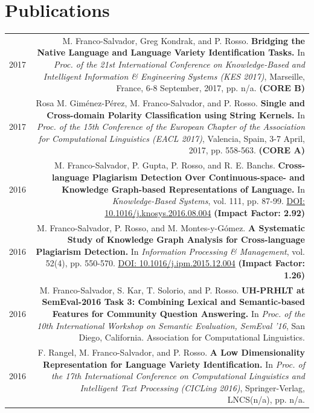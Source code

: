 \documentclass[10pt]{article}
\begin{document}
\section*{Publications}
\begin{tabular}{L!{\VRule}R}
	2017&M. Franco-Salvador, Greg Kondrak, and P. Rosso. \textbf{Bridging the Native Language and Language Variety Identification Tasks.}
	In \emph{Proc. of the 21st International Conference on Knowledge-Based and Intelligent Information \& Engineering Systems (KES 2017)}, Marseille, France, 6-8 September, 2017, pp. n/a. \textbf{(CORE B)}\vspace{5pt}\\
2017&Rosa M. Gim{\'e}nez-P{\'e}rez, M. Franco-Salvador, and P. Rosso. \textbf{Single and Cross-domain Polarity Classification using String Kernels.}
    In \emph{Proc. of the 15th Conference of the European Chapter of the Association for Computational Linguistics (EACL 2017)}, Valencia, Spain, 3-7 April, 2017, pp. 558-563. \textbf{(CORE A)}\vspace{5pt}\\
2016&M. Franco-Salvador, P. Gupta, P. Rosso, and R. E. Banchs. \textbf{Cross-language Plagiarism Detection Over Continuous-space- and Knowledge Graph-based Representations of Language.}
    In \emph{Knowledge-Based Systems}, vol. 111, pp. 87-99. \href{http://dx.doi.org/10.1016/j.knosys.2016.08.004}{DOI: 10.1016/j.knosys.2016.08.004} \textbf{(Impact Factor: 2.92)} \vspace{5pt}\\
2016&M. Franco-Salvador, P. Rosso, and M. Montes-y-G{\'o}mez. \textbf{A Systematic Study of Knowledge Graph Analysis for Cross-language Plagiarism Detection.}
    In \emph{Information Processing \& Management}, vol. 52(4), pp. 550-570. \href{http://dx.doi.org/10.1016/j.ipm.2015.12.004}{DOI: 10.1016/j.ipm.2015.12.004} \textbf{(Impact Factor: 1.26)} \vspace{5pt}\\
2016 &M. Franco-Salvador, S. Kar, T. Solorio, and P. Rosso. \textbf{UH-PRHLT at SemEval-2016 Task 3: Combining Lexical and Semantic-based Features for Community Question Answering.} In \emph{Proc. of the 10th International Workshop on Semantic Evaluation, SemEval '16}, San Diego, California. Association for Computational Linguistics. \vspace{5pt}\\
2016 &F. Rangel, M. Franco-Salvador, and P. Rosso. \textbf{A Low Dimensionality Representation for Language Variety Identification.} In \emph{Proc. of the 17th International Conference on Computational Linguistics and Intelligent Text Processing (CICLing 2016)}, Springer-Verlag, LNCS(n/a), pp. n/a. \vspace{5pt}\\
   \end{tabular}
\end{document}

